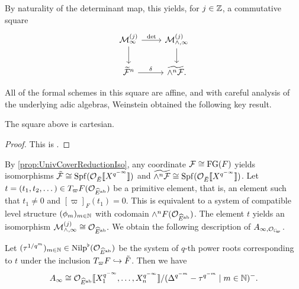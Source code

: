\documentclass[../main.tex]{subfiles}
\begin{document}
By naturality of the determinant map, this yields, for
$j \in \mathbb{Z}$, a commutative square 
\begin{equation*}
    \begin{tikzcd}[ampersand replacement=\&]
      {\cM_\infty^{(j)}} \& {\cM_{\wedge, \infty}^{(j)}} \\
    	{\widetilde \cF^n} \& {\widetilde{\wedge^n \cF}.}
    	\arrow["\det", from=1-1, to=1-2]
    	\arrow[from=1-1, to=2-1]
    	\arrow[from=1-2, to=2-2]
    	\arrow["\delta", from=2-1, to=2-2]
    \end{tikzcd}
\end{equation*}

All of the formal schemes in this square are affine, and with careful analysis
of the underlying adic algebras, Weinstein obtained the following key
result.

\begin{thm}\label{thm:WeinsteinsCartesianSquare}
  The square above is cartesian.
  \begin{proof}
  This is \cite[Theorem 2.17]{weinstein2016semistable}.
\end{proof}
\end{thm}

By \cref{prop:UnivCoverReductionIso}, any coordinate $\mathcal{F} \cong \textnormal{FG}(F)$ yields
isomorphisms $\tilde {\mathcal{F}} \cong \operatorname{Spf}(\mathcal{O}_{\breve {E}} \llbracket X^{q^{-\infty}}\rrbracket)$ and
$\widetilde{\wedge^n \mathcal{F}} \cong \operatorname{Spf}(\mathcal{O}_{\breve {E}} \llbracket X^{q^{-\infty}}\rrbracket)$.
Let $t = (t_1, t_2, \dots) \in T_\varpi F(\mathcal{O}_{\widehat E^{\mathrm{ab}}})$ be a primitive element,
that is, an element such that $t_1 \neq 0$ and $[\varpi]_F(t_1) = 0$. 
This is equivalent to a system of compatible level structure $(\phi_m)_{m \in
\mathbb{N}}$ with codomain $\wedge^n F(\mathcal{O}_{\widehat E ^{\mathrm{ab}}})$. 
The element $t$ yields an isomorphism $\mathcal{M}_{\wedge,
\infty}^{(j)} \cong  \mathcal{O}_{\widehat E^{\mathrm{ab}}}.$ We obtain the following description of
$A_{\infty, \cO_\Cp}$. 

\begin{cor}\label{cor:StructureOfAinfty}
  Let $(\tau^{1/q^m})_{m \in \mathbb{N}} \in {\mathrm{Nilp}}^\flat(\mathcal{O}_{\widehat E^{\mathrm{ab}}})$ be the
  system of $q$-th power roots corresponding to $t$ under the inclusion
  $T_\varpi F \hookrightarrow \tilde F$. Then we have 
  \begin{equation*}
    A_\infty \cong \mathcal{O}_{\widehat E^{\mathrm{ab}}}\llbracket X_1^{q^{-\infty}}, \dots,
    X_n^{q^{-\infty}}\rrbracket/(\Delta^{q^{-m}} - \tau^{q^{-m}} \mid m \in \mathbb{N})^-.
  \end{equation*}
\end{cor}
\end{document}
